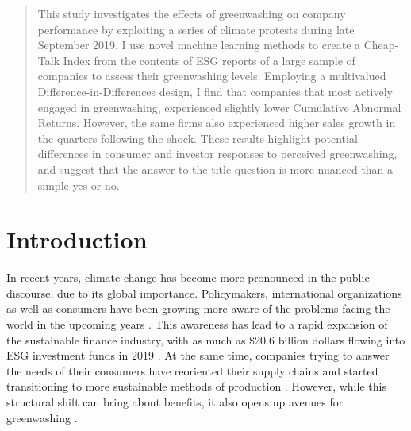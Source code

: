 \documentclass[12pt]{article}
\author{Your Name}
\date{Date of submission: \today}
\begin{document}

\pagebreak
{}

\begin{abstract}
This study investigates the effects of greenwashing on company performance by exploiting a series of climate protests during late September 2019. I use novel machine learning methods to create a Cheap-Talk Index from the contents of ESG reports of a large sample of companies to assess their greenwashing levels. Employing a multivalued Difference-in-Differences design, I find that companies that most actively engaged in greenwashing, experienced slightly lower Cumulative Abnormal Returns. However, the same firms also experienced higher sales growth in the quarters following the shock. These results highlight potential differences in consumer and investor responses to perceived greenwashing, and suggest that the answer to the title question is more nuanced than a simple yes or no.  

\end{abstract}
\pagebreak

\tableofcontents
\listoffigures
\listoftables
\pagebreak

\setcounter{page}{1}

\section{Introduction}\label{sect:introduction}

In recent years, climate change has become more pronounced in the public discourse, due to its global importance. Policymakers, international organizations as well as consumers have been growing more aware of the problems facing the world in the upcoming years \parencite{pew2022climate}. This awareness has lead to a rapid expansion of the sustainable finance industry, with as much as \$20.6 billion dollars flowing into ESG investment funds in 2019 \parencite{hale2020sustainable}. At the same time, companies trying to answer the needs of their consumers have reoriented their supply chains and started transitioning to more sustainable methods of production \parencite{pwc2023supplychain, pwc2023sustainability}. However, while this structural shift can bring about benefits, it also opens up avenues for greenwashing \parencite{villenaMoreSustainableSupply2020}.
\end{document}
